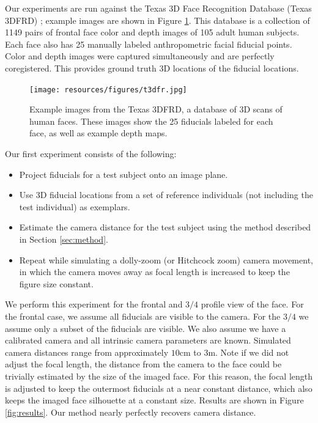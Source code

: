 \documentclass[runningheads]{llncs}
\begin{document}
Our experiments are run against the Texas 3D Face Recognition Database (Texas 3DFRD) \cite{gupta2010texas}; example images are shown in Figure \ref{fig:t3dfrd}.  
This database is a collection of 1149 pairs of frontal face color and depth images of 105 adult human subjects.  
Each face also has 25 manually labeled anthropometric facial fiducial points.  
Color and depth images were captured simultaneously and are perfectly coregistered.  
This provides ground truth 3D locations of the fiducial locations.  

\begin{figure}[h]
\centering
\texttt{[image: resources/figures/t3dfr.jpg]}
\caption{
Example images from the Texas 3DFRD, a database of 3D scans of human faces.
These images show the 25 fiducials labeled for each face, as well as example depth maps.
}
\label{fig:t3dfrd}
\end{figure}

Our first experiment consists of the following:
\begin{itemize}
\item Project fiducials for a test subject onto an image plane.
\item Use 3D fiducial locations from a set of reference individuals (not including the test individual) as exemplars.
\item Estimate the camera distance for the test subject using the method described in Section \ref{sec:method}.
\item Repeat while simulating a dolly-zoom (or Hitchcock zoom) camera movement, in which the camera moves away as focal length is increased to keep the figure size constant.
\end{itemize}

We perform this experiment for the frontal and $3/4$ profile view of the face.  
For the frontal case, we assume all fiducials are visible to the camera.  
For the $3/4$ we assume only a subset of the fiducials are visible. 
We also assume we have a calibrated camera and all intrinsic camera parameters are known.  
Simulated camera distances range from approximately $10$cm to $3$m.
Note if we did not adjust the focal length, the distance from the camera to the face could be trivially estimated by the size of the imaged face. 
For this reason, the focal length is adjusted to keep the outermost fiducials at a near constant distance, which also keeps the imaged face silhouette at a constant size.
Results are shown in Figure \ref{fig:results}.
Our method nearly perfectly recovers camera distance.
\end{document}

